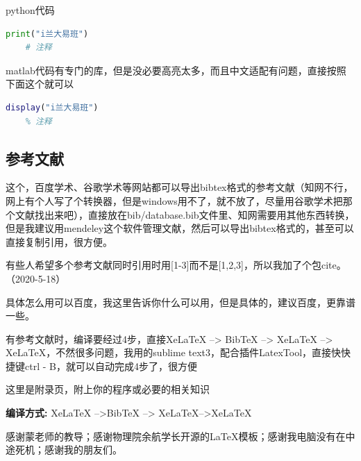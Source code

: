 \documentclass[AutoFakeBold]{LZUThesis2007}
\begin{document}
python代码
\begin{lstlisting}[language = python]
    print("i兰大易班")
    # 注释
\end{lstlisting}

matlab代码有专门的库，但是没必要高亮太多，而且中文适配有问题，直接按照下面这个就可以
\begin{lstlisting}[language = matlab]
    display("i兰大易班")
    % 注释
\end{lstlisting}


\subsection{参考文献} %
\label{sub:参考文献}

这个，百度学术、谷歌学术等网站都可以导出bibtex格式的参考文献（知网不行，网上有个人写了个转换器，但是windows用不了，就不放了，尽量用谷歌学术把那个文献找出来吧），直接放在bib/database.bib文件里、知网需要用其他东西转换，但是我建议用mendeley这个软件管理文献，然后可以导出bibtex格式的，甚至可以直接复制引用，很方便\cite{partl2016, tenne1992polyhedral, tussyadiah2015hotels}。

有些人希望多个参考文献同时引用时用[1-3]而不是[1,2,3]，所以我加了个包cite。（2020-5-18）

具体怎么用可以百度，我这里告诉你什么可以用，但是具体的，建议百度，更靠谱一些。


有参考文献时，编译要经过4步，直接XeLaTeX --> BibTeX --> XeLaTeX --> XeLaTeX，不然很多问题，我用的sublime text3，配合插件LatexTool，直接快快捷键ctrl - B，就可以自动完成4步了，很方便






\backmatter


\printbib



\Appendix


这里是附录页，附上你的程序或必要的相关知识

{\bfseries 编译方式:} XeLaTeX -->BibTeX --> XeLaTeX-->XeLaTeX


\Thanks

感谢蒙老师的教导；感谢物理院余航学长开源的LaTeX模板；感谢我电脑没有在中途死机；感谢我的朋友们。



\supervisorcomment{}

\recommendedgrade{}

\supervisorsignature{
    \raisebox{-10pt}{
    }
}

\committeecomment{}

\finalgrade{}

\Grade %
\end{document}
